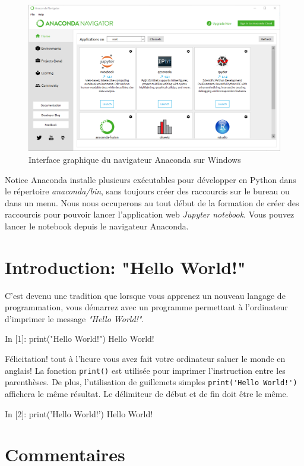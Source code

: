 \documentclass[%
oneside,                 %
final,                   %
10pt]{article}
\begin{document}
\begin{figure}[!ht]  %
  \centerline{\includegraphics[width=0.7\linewidth]{imgs/AnacondaNavigator.png}}
  \caption{
  Interface graphique du navigateur Anaconda sur Windows
  }
\end{figure}


\begin{block}{Notice}
Anaconda installe plusieurs exécutables pour développer en Python dans le répertoire \emph{anaconda/bin}, sans toujours créer des raccourcis sur le bureau ou dans un menu. Nous nous occuperons au tout début de la formation de créer des raccourcis pour pouvoir lancer l'application web \emph{Jupyter notebook}. Vous pouvez lancer le notebook depuis le navigateur Anaconda.
\end{block}

\section{Introduction: "Hello World!"}
C'est devenu une tradition que lorsque vous apprenez un nouveau langage de programmation, vous démarrez avec un programme permettant à l'ordinateur d'imprimer le message \emph{"Hello World!"}.

\bipy
In [1]: print("Hello World!")
Hello World!
\eipy

Félicitation! tout à l'heure vous avez fait votre ordinateur saluer le monde en anglais! La fonction \texttt{print()} est utilisée pour imprimer l’instruction entre les parenthèses. De plus, l'utilisation de guillemets simples \Verb?print('Hello World!')? affichera le même résultat. Le délimiteur de début et de fin doit être le même.

\bipy
In [2]: print('Hello World!')
Hello World!
\eipy

\section{Commentaires}
\end{document}
